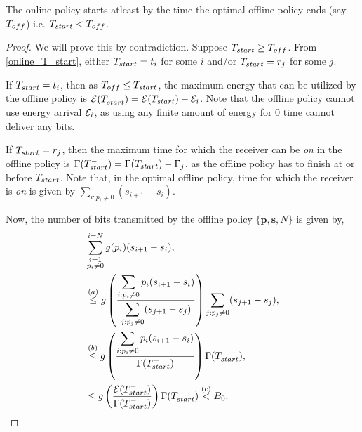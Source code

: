 \begin{lemma}
The online policy starts atleast by the time the optimal offline policy ends (say $T_{\mbox{\scriptsize{off}}}$) i.e. $T_{\mbox{\scriptsize{start}}} <T_{\mbox{\scriptsize{off}}}$.
\label{onilne_time}
\end{lemma}


\begin{proof}
We will prove this by contradiction. Suppose $T_{\mbox{\scriptsize{start}}} \ge T_{\mbox{\scriptsize{off}}}$. From \eqref{online_T_start}, either $T_{\mbox{\scriptsize{start}}}=t_i$ for some $i$ and/or $T_{\mbox{\scriptsize{start}}}=r_j$ for some $j$.

If $T_{\mbox{\scriptsize{start}}}=t_i$, then as $T_{\mbox{\scriptsize{off}}}\le T_{\mbox{\scriptsize{start}}}$, the maximum energy that can be utilized by the offline policy is $\ETx(T_{\mbox{\scriptsize{start}}}^-)=\ETx(T_{\mbox{\scriptsize{start}}})-\ETx_i$. Note that the offline policy cannot use energy arrival $\mathcal{E}_i$, as using any finite amount of energy for 0 time cannot deliver any bits. 

If $T_{\mbox{\scriptsize{start}}}=r_j$, then the maximum time for which the receiver can be \textit{on} in the offline policy is $\TRx(T_{\mbox{\scriptsize{start}}}^-)=\TRx(T_{\mbox{\scriptsize{start}}})-\TRx_j$, as the offline policy has to finish at or before $T_{\mbox{\scriptsize{start}}}$. Note that, in the optimal offline policy, time for which the receiver is \textit{on} is given by $\displaystyle \sum_{i:p_i\neq 0}(s_{i+1}-s_i)$. 

Now, the number of bits transmitted by the offline policy $\{\bm{p},\bm{s},N\}$ is given by,
\begin{align}
&\sum_{{\substack{i=1\\p_i\neq 0}}}^{i=N} g(p_i)(s_{i+1}-s_{i}),
\\
&\nonumber \stackrel{(a)}{\le}g\left(\frac{\displaystyle\sum_{i:p_i\neq 0}p_i(s_{i+1}-s_{i})}{\displaystyle\sum_{j:p_j\neq 0}(s_{j+1}-s_{j})}\right)\sum_{j:p_j\neq 0} (s_{j+1}-s_{j}),
\\
&\nonumber\stackrel{(b)}{\le} g\left( \frac{\displaystyle\sum_{i:p_i\neq 0} p_i(s_{i+1}-s_{i})}{\TRx(T_{\mbox{\scriptsize{start}}}^-)} \right)\TRx(T_{\mbox{\scriptsize{start}}}^-), 
\\
&\le g\left(\frac{\ETx(T_{\mbox{\scriptsize{start}}}^-)}{\TRx(T_{\mbox{\scriptsize{start}}}^-)}\right)\TRx(T_{\mbox{\scriptsize{start}}}^-)\stackrel{(c)}{<}B_0.\label{online_eq_2}
\end{align}


\end{proof}
